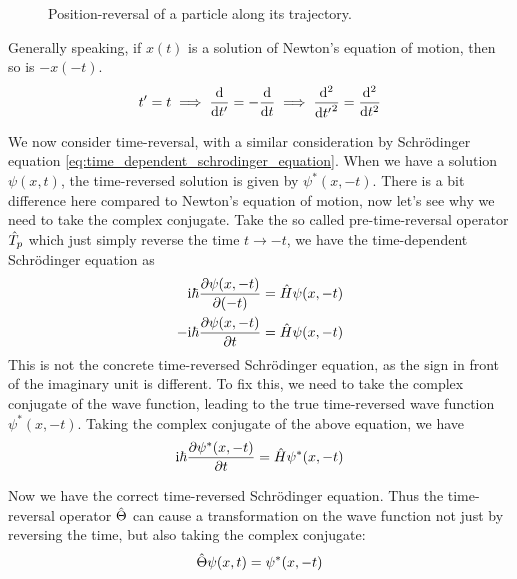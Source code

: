 \begin{figure}[h!]
\caption{Position-reversal of a particle along its trajectory.}
\end{figure}

Generally speaking, if $x(t)$ is a solution of Newton's equation of motion, then so is $-x(-t)$.
\begin{align}
    t'=t \implies \frac{\mathrm{d}}{\mathrm{d} t'} = - \frac{\mathrm{d}}{\mathrm{d} t} \implies \frac{\mathrm{d}^2 }{\mathrm{d} {t'} ^2} = \frac{\mathrm{d}^2 }{\mathrm{d} t ^2}
\end{align}

We now consider time-reversal, with a similar consideration by Schrödinger equation \cref{eq:time_dependent_schrodinger_equation}. When we have a solution $\psi(x,t)$, the time-reversed solution is given by $\psi^*(x,-t)$. There is a bit difference here compared to Newton's equation of motion, now let's see why we need to take the complex conjugate. Take the so called pre-time-reversal operator $\hat{T}_p$ which just simply reverse the time $t \to -t$, we have the time-dependent Schrödinger equation as
\begin{align*}
    \mathrm{i} \hbar \frac{\partial \psi(x,-t)}{\partial (-t)} = \hat{H} \psi(x,-t) \\
    - \mathrm{i} \hbar \frac{\partial \psi(x,-t)}{\partial t} = \hat{H} \psi(x,-t)
\end{align*}
This is not the concrete time-reversed Schrödinger equation, as the sign in front of the imaginary unit is different. To fix this, we need to take the complex conjugate of the wave function, leading to the true time-reversed wave function $\psi^*(x,-t)$. Taking the complex conjugate of the above equation, we have
\begin{align*}
    \mathrm{i} \hbar \frac{\partial \psi^*(x,-t)}{\partial t} = \hat{H} \psi^*(x,-t)
\end{align*}

Now we have the correct time-reversed Schrödinger equation. Thus the time-reversal operator $\hat{\Theta}$ can cause a transformation on the wave function not just by reversing the time, but also taking the complex conjugate:
\begin{align*}
    \hat{\Theta} \psi(x,t) = \psi^*(x,-t)
\end{align*}

